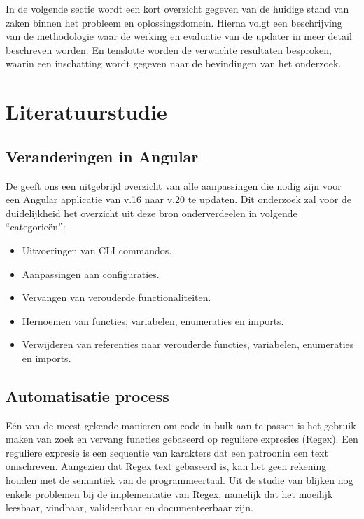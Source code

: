 In de volgende sectie wordt een kort overzicht gegeven van de huidige stand van zaken binnen het probleem en oplossingsdomein.
Hierna volgt een beschrijving van de methodologie waar de werking en evaluatie van de updater in meer detail beschreven worden.
En tenslotte worden de verwachte resultaten besproken, waarin een inschatting wordt gegeven naar de bevindingen van het onderzoek.

\section{Literatuurstudie}
\label{sec:literatuurstudie}

\subsection{Veranderingen in Angular}

De \textcite{AngularUpdateGuide} geeft ons een uitgebrijd overzicht van alle aanpassingen die nodig zijn voor een Angular applicatie van v.16 naar v.20 te updaten. 
Dit onderzoek zal voor de duidelijkheid het overzicht uit deze bron onderverdeelen in volgende ``categorieën'':

\begin{itemize}
  \item Uitvoeringen van CLI commandos.
  \item Aanpassingen aan configuraties.
  \item Vervangen van verouderde functionaliteiten.
  \item Hernoemen van functies, variabelen, enumeraties en imports.
  \item Verwijderen van referenties naar verouderde functies, variabelen, enumeraties en imports.
\end{itemize}

\subsection{Automatisatie process}

Eén van de meest gekende manieren om code in bulk aan te passen is het gebruik maken van zoek en vervang functies gebaseerd op reguliere expresies (Regex).
Een reguliere expresie is een sequentie van karakters dat een patroonin een text omschreven.
Aangezien dat Regex text gebaseerd is, kan het geen rekening houden met de semantiek van de programmeertaal.
Uit de studie van \textcite{Michael2019} blijken nog enkele problemen bij de implementatie van Regex, namelijk dat het moeilijk leesbaar, vindbaar, valideerbaar en documenteerbaar zijn.

